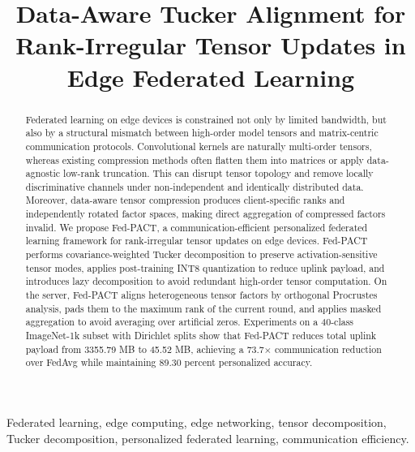 \documentclass[conference]{IEEEtran}
\begin{document}
\title{Data-Aware Tucker Alignment for Rank-Irregular Tensor Updates in Edge Federated Learning}

\author{
}
\maketitle


\begin{abstract}
    Federated learning on edge devices is constrained not only by limited bandwidth, but also by a structural mismatch between high-order model tensors and matrix-centric communication protocols. Convolutional kernels are naturally multi-order tensors, whereas existing compression methods often flatten them into matrices or apply data-agnostic low-rank truncation. This can disrupt tensor topology and remove locally discriminative channels under non-independent and identically distributed data. Moreover, data-aware tensor compression produces client-specific ranks and independently rotated factor spaces, making direct aggregation of compressed factors invalid. We propose Fed-PACT, a communication-efficient personalized federated learning framework for rank-irregular tensor updates on edge devices. Fed-PACT performs covariance-weighted Tucker decomposition to preserve activation-sensitive tensor modes, applies post-training INT8 quantization to reduce uplink payload, and introduces lazy decomposition to avoid redundant high-order tensor computation. On the server, Fed-PACT aligns heterogeneous tensor factors by orthogonal Procrustes analysis, pads them to the maximum rank of the current round, and applies masked aggregation to avoid averaging over artificial zeros. Experiments on a 40-class ImageNet-1k subset with Dirichlet splits show that Fed-PACT reduces total uplink payload from 3355.79 MB to 45.52 MB, achieving a 73.7$\times$ communication reduction over FedAvg while maintaining 89.30 percent personalized accuracy.
\end{abstract}

\begin{IEEEkeywords}
    Federated learning, edge computing, edge networking, tensor decomposition, Tucker decomposition, personalized federated learning, communication efficiency.
\end{IEEEkeywords}
\end{document}
